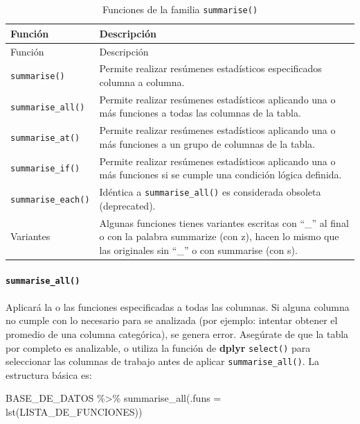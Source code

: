 \documentclass[
]{article}
\newenvironment{Shaded}{\begin{snugshade}}{\end{snugshade}}
\newcommand{\AttributeTok}[1]{\textcolor[rgb]{0.77,0.63,0.00}{#1}}
\newcommand{\FunctionTok}[1]{\textcolor[rgb]{0.00,0.00,0.00}{#1}}
\newcommand{\NormalTok}[1]{#1}
\newcommand{\SpecialCharTok}[1]{\textcolor[rgb]{0.00,0.00,0.00}{#1}}
\theoremstyle{definition}
\theoremstyle{definition}
\theoremstyle{definition}
\theoremstyle{definition}
\theoremstyle{remark}
\begin{document}
\begin{longtable}[]{@{}ll@{}}
\caption{\label{tab:unnamed-chunk-44}Funciones de la familia \texttt{summarise()}}\tabularnewline
\toprule()
Función & Descripción \\
\midrule()
\endfirsthead
\toprule()
Función & Descripción \\
\midrule()
\endhead
\texttt{summarise()} & Permite realizar resúmenes estadísticos especificados columna a columna. \\
\texttt{summarise\_all()} & Permite realizar resúmenes estadísticos aplicando una o más funciones a todas las columnas de la tabla. \\
\texttt{summarise\_at()} & Permite realizar resúmenes estadísticos aplicando una o más funciones a un grupo de columnas de la tabla. \\
\texttt{summarise\_if()} & Permite realizar resúmenes estadísticos aplicando una o más funciones si se cumple una condición lógica definida. \\
\texttt{summarise\_each()} & Idéntica a \texttt{summarise\_all()} es considerada obsoleta (deprecated). \\
Variantes & Algunas funciones tienes variantes escritas con ``\_'' al final o con la palabra summarize (con z), hacen lo mismo que las originales sin ``\_'' o con summarise (con s). \\
\bottomrule()
\end{longtable}

\hypertarget{summarise_all}{%
\paragraph{\texorpdfstring{\texttt{summarise\_all()}}{summarise\_all()}}\label{summarise_all}}

Aplicará la o las funciones especificadas a todas las columnas. Si alguna columna no cumple con lo necesario para se analizada (por ejemplo: intentar obtener el promedio de una columna categórica), se genera error. Asegúrate de que la tabla por completo es analizable, o utiliza la función de \textbf{dplyr} \texttt{select()} para seleccionar las columnas de trabajo antes de aplicar \texttt{summarise\_all()}. La estructura básica es:

\begin{Shaded}
\begin{Highlighting}[]
\NormalTok{BASE\_DE\_DATOS }\SpecialCharTok{\%\textgreater{}\%} 
  \FunctionTok{summarise\_all}\NormalTok{(}\AttributeTok{.funs =} \FunctionTok{lst}\NormalTok{(LISTA\_DE\_FUNCIONES))}
\end{Highlighting}
\end{Shaded}
\end{document}
